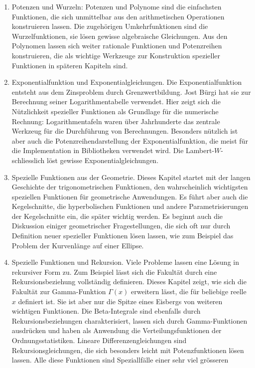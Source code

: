 \begin{enumerate}
\item
Potenzen und Wurzeln: Potenzen und Polynome sind die einfachsten
Funktionen, die sich unmittelbar aus den arithmetischen Operationen
konstruieren lassen.
Die zugehörigen Umkehrfunktionen sind die Wurzelfunktionen,
sie lösen gewisse algebraische Gleichungen.
Aus den Polynomen lassen sich weiter rationale Funktionen und
Potenzreihen konstruieren, die als wichtige Werkzeuge zur Konstruktion
spezieller Funktionen in späteren Kapiteln sind.
\item
Exponentialfunktion und Exponentialgleichungen.
Die Exponentialfunktion entsteht aus dem Zinsproblem durch Grenzwertbildung.
Jost Bürgi hat sie zur Berechnung seiner Logarithmentabelle verwendet.
Hier zeigt sich die Nützlichkeit spezieller Funktionen als Grundlage
für die numerische Rechnung: Logarithmentafeln waren über Jahrhunderte
das zentrale Werkzeug für die Durchführung von Berechnungen.
Besonders nützlich ist aber auch die Potenzreihendarstellung der
Exponentialfunktion, die meist für die Implementation in Bibliotheken
verwendet wird.
Die Lambert-$W$-schliesslich löst gewisse Exponentialgleichungen.
\item
Spezielle Funktionen aus der Geometrie.
Dieses Kapitel startet mit der langen Geschichte der trigonometrischen
Funktionen, den wahrscheinlich wichtigsten speziellen Funktionen für
geometrische Anwendungen.
Es führt aber auch die Kegelschnitte, die hyperbolischen Funktionen
und andere Parametrisierungen der Kegelschnitte ein, die später
wichtig werden.
Es beginnt auch die Diskussion einiger geometrischer Fragestellungen,
die sich oft nur durch Definition neuer spezieller Funktionen lösen
lassen, wie zum Beispiel das Problem der Kurvenlänge auf einer
Ellipse.
\item
Spezielle Funktionen und Rekursion.
Viele Probleme lassen eine Lösung in rekursiver Form zu.
Zum Beispiel lässt sich die Fakultät durch eine Rekursionsbeziehung
vollständig definieren.
Dieses Kapitel zeigt, wie sich die Fakultät zur Gamma-Funktion
$\Gamma(x)$ erweitern lässt, die für beliebige reelle $x$
definiert ist.
Sie ist aber nur die Spitze eines Eisbergs von weiteren wichtigen
Funktionen.
Die Beta-Integrale sind ebenfalls durch Rekursionsbeziehungen
charakterisiert, lassen sich durch Gamma-Funktionen ausdrücken und 
haben als Anwendung die Verteilungsfunktionen der Ordnungsstatistiken.
Lineare Differenzengleichungen sind Rekursionsgleichungen, die sich
besonders leicht mit Potenzfunktionen lösen lassen.
Alle diese Funktionen sind Speziallfälle einer sehr viel grösseren

\end{enumerate}
